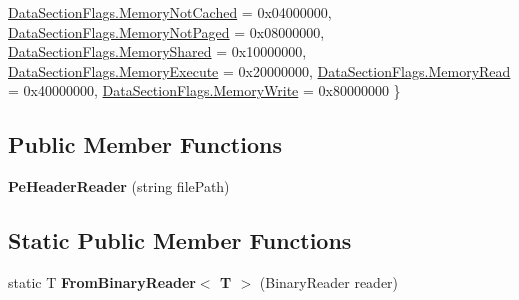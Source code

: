 \begin{DoxyCompactItemize}
\mbox{\hyperlink{class_class_library_server_1_1_struct_1_1_pe_header_reader_a4ae33a797e1f1bb3585427a468f7b259a464fabb621c581183a5c410fc2ca7c7f}{Data\+Section\+Flags.\+Memory\+Not\+Cached}} = 0x04000000, 
\mbox{\hyperlink{class_class_library_server_1_1_struct_1_1_pe_header_reader_a4ae33a797e1f1bb3585427a468f7b259af17f8f106acef3fd0ff47b8cca4de356}{Data\+Section\+Flags.\+Memory\+Not\+Paged}} = 0x08000000, 
\mbox{\hyperlink{class_class_library_server_1_1_struct_1_1_pe_header_reader_a4ae33a797e1f1bb3585427a468f7b259abfa33c37b72f766266c354cb6eb01d3a}{Data\+Section\+Flags.\+Memory\+Shared}} = 0x10000000, 
\mbox{\hyperlink{class_class_library_server_1_1_struct_1_1_pe_header_reader_a4ae33a797e1f1bb3585427a468f7b259a817041d31daef398c32f9e2efc8c482f}{Data\+Section\+Flags.\+Memory\+Execute}} = 0x20000000, 
\newline
\mbox{\hyperlink{class_class_library_server_1_1_struct_1_1_pe_header_reader_a4ae33a797e1f1bb3585427a468f7b259a575da5d1d4109b111267b2e044af2aad}{Data\+Section\+Flags.\+Memory\+Read}} = 0x40000000, 
\mbox{\hyperlink{class_class_library_server_1_1_struct_1_1_pe_header_reader_a4ae33a797e1f1bb3585427a468f7b259a5e932342aab40efaef1a503864403168}{Data\+Section\+Flags.\+Memory\+Write}} = 0x80000000
 \}
\end{DoxyCompactItemize}
\subsection*{Public Member Functions}
\begin{DoxyCompactItemize}
\item 
\mbox{\label{class_class_library_server_1_1_struct_1_1_pe_header_reader_aac5f86224d412037c40f92d09997d810}} 
{\bfseries Pe\+Header\+Reader} (string file\+Path)
\end{DoxyCompactItemize}
\subsection*{Static Public Member Functions}
\begin{DoxyCompactItemize}
\item 
\mbox{\label{class_class_library_server_1_1_struct_1_1_pe_header_reader_a308fa74984feed987e91ad1d2fc81cd4}} 
static T {\bfseries From\+Binary\+Reader$<$ T $>$} (Binary\+Reader reader)
\end{DoxyCompactItemize}
